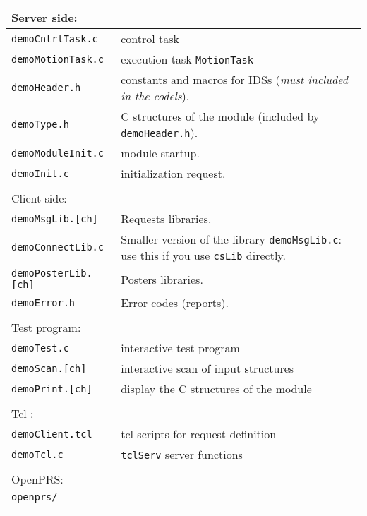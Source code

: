 \begin{center}\small
 \begin{tabularx}{\linewidth}{|l|X|}
 \hline
 \multicolumn{2}{|l|}{Server side: } \\
 \hline
 \texttt{demoCntrlTask.c}& control task \\
 \texttt{demoMotionTask.c}& execution task \texttt{MotionTask}  \\
 \texttt{demoHeader.h}&  constants and macros for IDSs (\emph{must included
in the codels}). \\
 \texttt{demoType.h}&  C structures of the module
 (included by \texttt{demoHeader.h}). \\ 
 \texttt{demoModuleInit.c}& module startup. \\
 \texttt{demoInit.c}& initialization request.  \\
 \hline
 \multicolumn{2}{l}{} \\

 \hline
 \multicolumn{2}{|l|}{Client side: } \\
 \hline
 \texttt{demoMsgLib.[ch]}  &  Requests libraries. \\
 \texttt{demoConnectLib.c}  &  Smaller version of the library 
\texttt{demoMsgLib.c}: use this if you use \texttt{csLib} directly. \\
 \texttt{demoPosterLib.[ch]}  &  Posters libraries.\\
 \texttt{demoError.h}  &  Error codes (reports).\\
 \hline
 \multicolumn{2}{l}{} \\

 \hline
 \multicolumn{2}{|l|}{Test program:} \\
 \hline
 \texttt{demoTest.c}  &  interactive test program\\
 \texttt{demoScan.[ch]}  &  interactive  scan of input structures\\
 \texttt{demoPrint.[ch]}  &  display the C structures of the module\\
 \hline
 \multicolumn{2}{l}{} \\

 \hline
 \multicolumn{2}{|l|}{Tcl :} \\
 \hline
 \texttt{demoClient.tcl}  &  tcl scripts for request definition\\
 \texttt{demoTcl.c}  &   \texttt{tclServ} server functions\\
 \hline
 \multicolumn{2}{l}{} \\

 \hline
 \multicolumn{2}{|l|}{OpenPRS:} \\
 \hline
 \texttt{openprs/}  & \\
 \hline
 \multicolumn{2}{l}{} \\


\end{tabularx}
\end{center}
